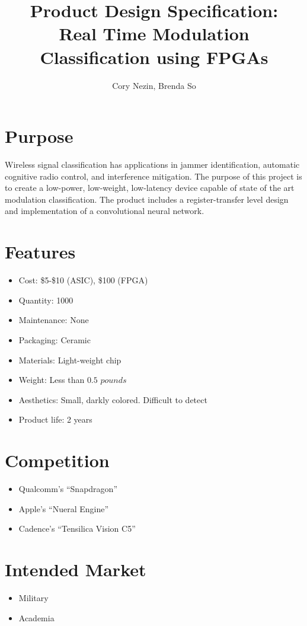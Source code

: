 \documentclass[12pt]{article}
\begin{document}
\title{Product Design Specification: \\
       \textbf{Real Time Modulation Classification using FPGAs}}
\author{Cory Nezin, Brenda So}
\maketitle

\renewcommand\thesection{\Alph{section}}
\section{Purpose}
Wireless signal classification has applications in jammer identification, automatic cognitive radio control, and interference mitigation.  The purpose of this project is to create a low-power, low-weight, low-latency device capable of state of the art modulation classification.  The product includes a register-transfer level design and implementation of a convolutional neural network.
\section{Features}
\begin{itemize}
\item Cost: \$5-\$10 (ASIC), \$100 (FPGA)
\item Quantity: 1000
\item Maintenance: None
\item Packaging: Ceramic
\item Materials: Light-weight chip
\item Weight: Less than $0.5$ $pounds$
\item Aesthetics: Small, darkly colored.  Difficult to detect
\item Product life: 2 years
\end{itemize}
\section{Competition}
\begin{itemize}
\item Qualcomm's ``Snapdragon''
\item Apple's ``Nueral Engine''
\item Cadence's ``Tensilica Vision C5''
\end{itemize}
\section{Intended Market}
\begin{itemize}
\item Military
\item Academia
\end{itemize}
\end{document}
